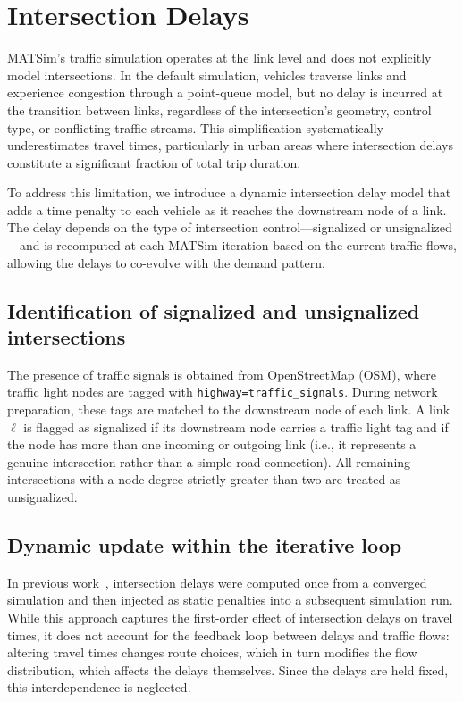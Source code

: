 
\section{Intersection Delays}
\label{sec:intersection_delays}

MATSim's traffic simulation operates at the link level and does not explicitly model intersections. In the default simulation, vehicles traverse links and experience congestion through a point-queue model, but no delay is incurred at the transition between links, regardless of the intersection's geometry, control type, or conflicting traffic streams. This simplification systematically underestimates travel times, particularly in urban areas where intersection delays constitute a significant fraction of total trip duration.

To address this limitation, we introduce a dynamic intersection delay model that adds a time penalty to each vehicle as it reaches the downstream node of a link. The delay depends on the type of intersection control---signalized or unsignalized---and is recomputed at each MATSim iteration based on the current traffic flows, allowing the delays to co-evolve with the demand pattern.

\subsection{Identification of signalized and unsignalized intersections}

The presence of traffic signals is obtained from OpenStreetMap (OSM), where traffic light nodes are tagged with \texttt{highway=traffic\_signals}. During network preparation, these tags are matched to the downstream node of each link. A link~$\ell$ is flagged as signalized if its downstream node carries a traffic light tag and if the node has more than one incoming or outgoing link (i.e., it represents a genuine intersection rather than a simple road connection). All remaining intersections with a node degree strictly greater than two are treated as unsignalized.

\subsection{Dynamic update within the iterative loop}

In previous work~\cite{AuroreTlDelays}, intersection delays were computed once from a converged simulation and then injected as static penalties into a subsequent simulation run. While this approach captures the first-order effect of intersection delays on travel times, it does not account for the feedback loop between delays and traffic flows: altering travel times changes route choices, which in turn modifies the flow distribution, which affects the delays themselves. Since the delays are held fixed, this interdependence is neglected.

